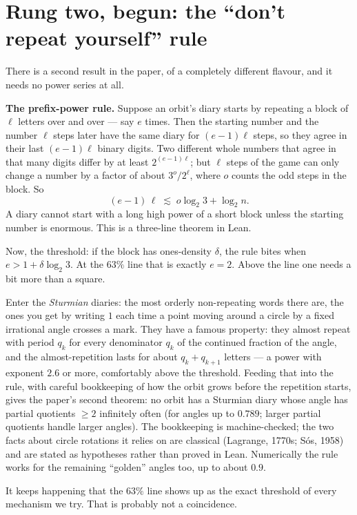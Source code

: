 \documentclass[11pt]{article}
\begin{document}
\section{Rung two, begun: the ``don't repeat yourself'' rule}

There is a second result in the paper, of a completely different
flavour, and it needs no power series at all.

\begin{keyidea}
\textbf{The prefix-power rule.} Suppose an orbit's diary starts by
repeating a block of $\ell$ letters over and over --- say $e$ times.
Then the starting number and the number $\ell$ steps later have the
same diary for $(e-1)\ell$ steps, so they agree in their last
$(e-1)\ell$ binary digits. Two different whole numbers that agree in
that many digits differ by at least $2^{(e-1)\ell}$; but $\ell$ steps
of the game can only change a number by a factor of about
$3^{o}/2^{\ell}$, where $o$ counts the odd steps in the block. So
\[
(e-1)\,\ell \;\lesssim\; o \log_2 3 + \log_2 n .
\]
A diary cannot start with a long high power of a short block unless
the starting number is enormous. This is a three-line theorem in Lean.
\end{keyidea}

Now, the threshold: if the block has ones-density $\delta$, the rule
bites when $e > 1 + \delta \log_2 3$. At the $63\%$ line that is
exactly $e = 2$. Above the line one needs a bit more than a square.

Enter the \emph{Sturmian} diaries: the most orderly non-repeating
words there are, the ones you get by writing $1$ each time a point
moving around a circle by a fixed irrational angle crosses a mark.
They have a famous property: they almost repeat with period $q_k$ for
every denominator $q_k$ of the continued fraction of the angle, and the
almost-repetition lasts for about $q_k + q_{k+1}$ letters --- a power
with exponent $2.6$ or more, comfortably above the threshold. Feeding
that into the rule, with careful bookkeeping of how the orbit grows
before the repetition starts, gives the paper's second theorem: no
orbit has a Sturmian diary whose angle has partial quotients $\ge 2$
infinitely often (for angles up to $0.789$; larger partial quotients
handle larger angles). The bookkeeping is machine-checked; the two
facts about circle rotations it relies on are classical
(Lagrange, 1770s; S\'os, 1958) and are stated as hypotheses rather
than proved in Lean. Numerically the rule works for the remaining
``golden'' angles too, up to about $0.9$.

It keeps happening that the $63\%$ line shows up as the exact
threshold of every mechanism we try. That is probably not a
coincidence.
\end{document}
